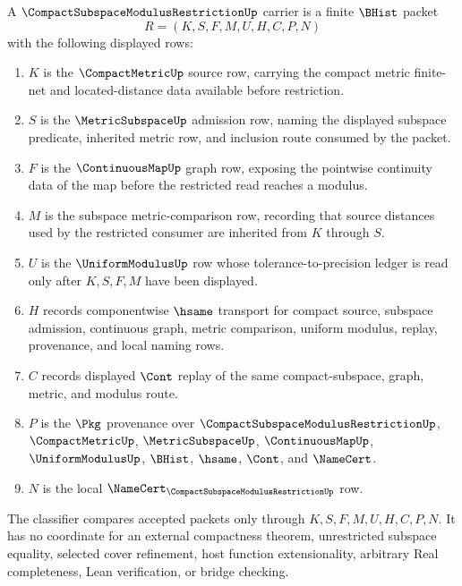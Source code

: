 \begin{definition}
\label{def:compact-subspace-modulus-restriction-carrier}
A $\CompactSubspaceModulusRestrictionUp$ carrier is a finite $\BHist$ packet
$$
R=(K,S,F,M,U,H,C,P,N)
$$
with the following displayed rows:
\begin{enumerate}
\item $K$ is the $\CompactMetricUp$ source row, carrying the compact metric finite-net and located-distance data available before restriction.
\item $S$ is the $\MetricSubspaceUp$ admission row, naming the displayed subspace predicate, inherited metric row, and inclusion route consumed by the packet.
\item $F$ is the $\ContinuousMapUp$ graph row, exposing the pointwise continuity data of the map before the restricted read reaches a modulus.
\item $M$ is the subspace metric-comparison row, recording that source distances used by the restricted consumer are inherited from $K$ through $S$.
\item $U$ is the $\UniformModulusUp$ row whose tolerance-to-precision ledger is read only after $K,S,F,M$ have been displayed.
\item $H$ records componentwise $\hsame$ transport for compact source, subspace admission, continuous graph, metric comparison, uniform modulus, replay, provenance, and local naming rows.
\item $C$ records displayed $\Cont$ replay of the same compact-subspace, graph, metric, and modulus route.
\item $P$ is the $\Pkg$ provenance over $\CompactSubspaceModulusRestrictionUp$, $\CompactMetricUp$, $\MetricSubspaceUp$, $\ContinuousMapUp$, $\UniformModulusUp$, $\BHist$, $\hsame$, $\Cont$, and $\NameCert$.
\item $N$ is the local $\NameCert_{\CompactSubspaceModulusRestrictionUp}$ row.
\end{enumerate}
The classifier compares accepted packets only through $K,S,F,M,U,H,C,P,N$. It has no coordinate for an external compactness theorem, unrestricted subspace equality, selected cover refinement, host function extensionality, arbitrary Real completeness, Lean verification, or bridge checking.
\end{definition}

